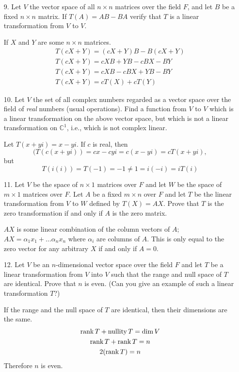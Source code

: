 \documentclass{article}
\begin{document}
\begin{enumerate}[listparindent=\parindent]
\item[9.] Let \(V\) the vector space of all \(n \times n\) matrices over the field \(F\), and let \(B\) be a fixed \(n \times n\) matrix.
    If \(T(A) = AB - BA\) verify that \(T\) is a linear transformation from \(V\) to \(V\).

    If \(X\) and \(Y\) are some \(n \times n\) matrices.
    \begin{gather*}
        T(cX + Y) = (cX + Y)B - B(cX + Y) \\
        T(cX + Y) = cXB + YB - cBX - BY \\
        T(cX + Y) = cXB - cBX + YB - BY \\
        T(cX + Y) = cT(X) + cT(Y)
    \end{gather*}

\item[10.] Let \(V\) the set of all complex numbers regarded as a vector space over the field of \textit{real} numbers (usual operations).
    Find a function from \(V\) to \(V\) which is a linear transformation on the above vector space, but which is not a linear transformation on \(\mathbb{C}^1\),
    i.e., which is not complex linear.

    Let \(T(x + yi) = x - yi\). If \(c\) is real, then \[(T(c(x + yi)) = cx - cyi = c(x - yi) = cT(x + yi),\]
    but \[T(i(i)) = T(-1) = -1 \neq 1 = i(-i) = iT(i)\]

\item[11.] Let \(V\) be the space of \(n \times 1\) matrices over \(F\) and let \(W\) be the space of \(m \times 1 \) matrices over \(F\).
    Let \(A\) be a fixed \(m \times n\) over \(F\) and let \(T\) be the linear transformation from \(V\) to \(W\) defined by \(T(X) = AX\).
    Prove that \(T\) is the zero transformation if and only if \(A\) is the zero matrix.

    \(AX\) is some linear combination of the column vectors of \(A\); \(AX = \alpha_1x_1 + \dots \alpha_nx_n\) where \(\alpha_i\) are columns of \(A\).
    This is only equal to the zero vector for any arbitrary \(X\) if and only if \(A = 0\).

\item[12.] Let \(V\) be an \(n\)-dimensional vector space over the field \(F\) and let \(T\) be a linear transformation from \(V\) into \(V\)
    such that the range and null space of \(T\) are identical. Prove that \(n\) is even. (Can you give an example of such a linear transformation \(T\)?)

    If the range and the null space of \(T\) are identical, then their dimensions are the same.
    \begin{gather*}
        \operatorname{rank} T + \operatorname{nullity} T = \dim V \\
        \operatorname{rank} T + \operatorname{rank} T = n \\
        2(\operatorname{rank} T) = n
    \end{gather*}
    Therefore \(n\) is even.


\end{enumerate}
\end{document}

